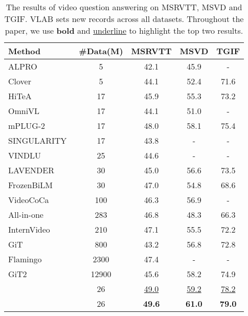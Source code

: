 \documentclass{article}
\begin{document}
\begin{table*}[]
\small
\setlength{\tabcolsep}{12pt}
\centering
\caption{The results of video question answering on MSRVTT, MSVD and TGIF. VLAB sets new records across all datasets. Throughout the paper, we use \textbf{bold} and \underline{underline} to highlight the top two results.}
\begin{tabular}{l|c|ccc}
\toprule
    Method                    &\#Data(M)   & MSRVTT     & MSVD  &TGIF \\

    \midrule
    ALPRO~\cite{li2022align}            &5      &42.1   &45.9   &-       \\
    Clover~\cite{huang2022clover}       &5      &44.1   &52.4   &71.6   \\
    HiTeA~\cite{ye2022hitea}            &17     &45.9   &55.3   &73.2   \\
    OmniVL~\cite{wangomnivl}            &17     &44.1   &51.0   &-      \\
    mPLUG-2~\cite{xu2023mplug}          &17     &48.0   &58.1   &75.4   \\
    SINGULARITY~\cite{lei2022revealing} &17     &43.8   &-      &-       \\
    VINDLU~\cite{cheng2022vindlu}       &25    &44.6   &-      &-      \\
    LAVENDER~\cite{li2022lavender}      &30     &45.0   &56.6   &73.5   \\
    FrozenBiLM\cite{yang2022zero}       &30     &47.0   &54.8   &68.6   \\
    VideoCoCa~\cite{yan2022video}       &100   &46.3   &56.9   &-       \\
    All-in-one~\cite{wang2022all}       &283    &46.8   &48.3   &66.3   \\ 
    InternVideo~\cite{wang2022internvideo} &210  &47.1  &55.5   &72.2   \\ 
    GiT~\cite{wang2022git}              &800   &43.2   &56.8    &72.8      \\
    Flamingo~\cite{alayrac2022flamingo} &2300   &47.4   &-      &-      \\
    GiT2~\cite{wang2022git}             &12900  &45.6   &58.2   &74.9   \\ 
    \midrule
     &26  &\underline{49.0} &\underline{59.2} &\underline{78.2}   \\
     &26  &\textbf{49.6} &\textbf{61.0}       &\textbf{79.0}      \\
    \bottomrule
\end{tabular}

\label{tab:results_cap_qa}
\end{table*}
\end{document}
